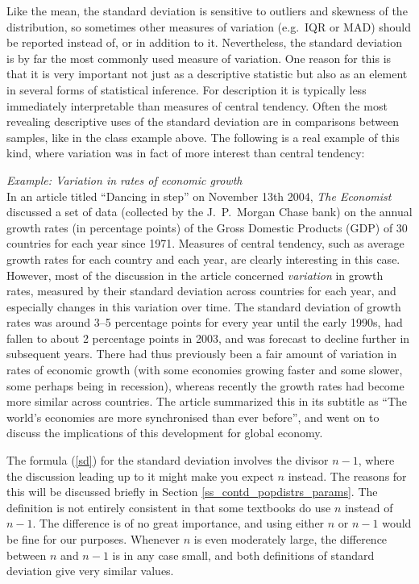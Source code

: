Like the mean, the standard deviation is sensitive to outliers and
skewness of the distribution, so sometimes other measures of variation
(e.g.\ IQR or MAD) should be reported instead of, or in addition to it.
Nevertheless, the standard deviation is by far the most commonly used
measure of variation. One reason for this is that it is very important
not just as a descriptive statistic but also as an element in
several forms of statistical inference. For description it is typically
less immediately interpretable than measures of central tendency. Often
the most revealing descriptive uses of the standard deviation are in
comparisons between samples, like in the class example above. The
following is a real
example of this kind, where variation was in fact of more interest
than central tendency:

\emph{Example: Variation in rates of economic growth}\\ In
an article titled ``Dancing in step'' on November 13th 2004, \emph{The
Economist} discussed a set of data (collected by the J.\ P.\
Morgan Chase bank) on the annual growth rates (in percentage
points) of the Gross Domestic Products (GDP) of 30 countries for each
year since 1971. Measures of central tendency, such as average growth
rates for each country and each year, are clearly interesting in this
case. However, most of the discussion in the article concerned
\emph{variation} in growth rates, measured by their standard deviation
across countries for each year, and especially changes in this variation
over time. The standard deviation of growth rates was around 3--5
percentage points for every year until the early 1990s, had fallen to
about 2 percentage points in 2003, and was forecast to decline further
in subsequent years. There had thus previously been a fair amount of
variation in rates of economic growth (with some economies growing
faster and some slower, some perhaps being in recession), whereas
recently the growth rates had become more similar across countries. The
article summarized this in its subtitle as ``The world's economies are
more synchronised than ever before'', and went on to discuss
the implications of this development for global economy.

The formula (\ref{sd}) for the standard deviation involves the divisor
$n-1$, where the discussion leading up to it might make you expect $n$
instead. The reasons for this will be discussed briefly in Section
\ref{ss_contd_popdistrs_params}. The definition is not entirely consistent in that
some textbooks do use $n$ instead of $n-1$. The difference is of no
great importance, and using either $n$ or $n-1$ would be fine for our
purposes. Whenever $n$ is even moderately large, the difference between
$n$ and $n-1$ is in any case small, and both definitions of standard
deviation give very similar values.

